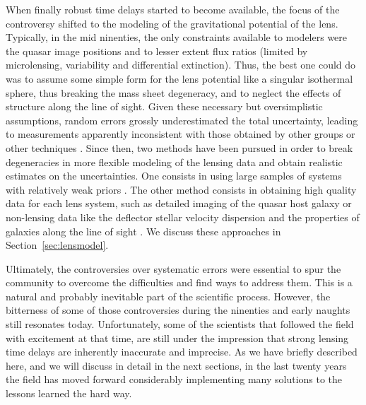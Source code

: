 When finally robust time delays started to become available, the focus
of the controversy shifted to the modeling of the gravitational
potential of the lens. Typically, in the mid ninenties, the only
constraints available to modelers were the quasar image positions and
to lesser extent flux ratios (limited by microlensing, variability and
differential extinction). Thus, the best one could do was to assume
some simple form for the lens potential like a singular isothermal
sphere, thus breaking the mass sheet degeneracy, and to neglect the
effects of structure along the line of sight. Given these necessary
but oversimplistic assumptions, random errors grossly underestimated
the total uncertainty, leading to measurements apparently inconsistent
with those obtained by other groups or other techniques
\cite{K+04}. Since then, two methods have been pursued in order to
break degeneracies in more flexible modeling of the lensing data and
obtain realistic estimates on the uncertainties. One consists in using
large samples of systems with relatively weak priors
\cite{Ogu07b}. The other method consists in obtaining high quality data for 
each lens system, such as detailed imaging of the quasar host galaxy
\cite{Keeton:2000p241,WBB04,Suy++06} or non-lensing data like the deflector 
stellar velocity dispersion \cite{T+K02b} and the properties of
galaxies along the line of sight \cite{K+Z04,Suy++10}. We discuss
these approaches in Section~\ref{sec:lensmodel}.

Ultimately, the controversies over systematic errors were essential to
spur the community to overcome the difficulties and find ways to
address them. This is a natural and probably inevitable part of the
scientific process. However, the bitterness of some of those
controversies during the ninenties and early naughts still resonates
today. Unfortunately, some of the scientists that followed the field
with excitement at that time, are still under the impression that
strong lensing time delays are inherently inaccurate and imprecise. As
we have briefly described here, and we will discuss in detail in the
next sections, in the last twenty years the field has moved forward
considerably implementing many solutions to the lessons learned the
hard way.
